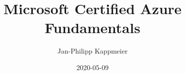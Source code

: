 \documentclass{article}
\begin{document}
    \title{Microsoft Certified Azure Fundamentals}
    \date{2020-05-09}
    \author{Jan-Philipp Kappmeier}

    \clearpage\maketitle
    \thispagestyle{empty}
    
    \pagebreak
\end{document}
